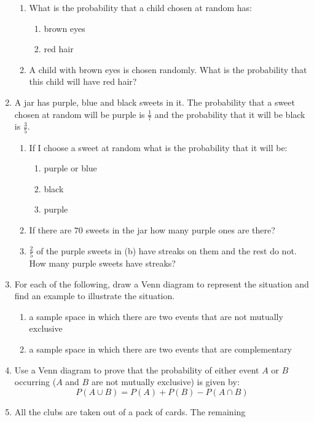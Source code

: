 \begin{eocexercises}{}
\begin{enumerate}[itemsep=5pt, label=\textbf{\arabic*}. ]
\begin{enumerate}[noitemsep, label=\textbf{(\alph*)} ]
    \item What is the probability that a child chosen at random has:
      \begin{enumerate}
      \item brown eyes
      \item red hair
      \end{enumerate} 
    \item A child with brown eyes is chosen randomly. What is the
      probability that this child will have red hair?
    \end{enumerate}
  \item A jar has purple, blue and black sweets in it. The probability
    that a sweet chosen at random will be purple is $\frac{1}{7}$
    and the probability that it will be black is $\frac{3}{5}$.
    \begin{enumerate}[noitemsep, label=\textbf{(\alph*)} ]
\item If I choose a sweet at random what
      is the probability that it will be:
      \begin{enumerate}
      \item purple or blue
      \item black
      \item purple
      \end{enumerate}
    \item If there are $70$ sweets in the jar how many purple ones are
      there?
    \item $\frac{2}{5}$ of the purple sweets in (b) have streaks on
      them and the rest do not. How many purple sweets have streaks?
    \end{enumerate}
\item For each of the following, draw a Venn diagram to represent
    the situation and find an example to illustrate the situation.
    \begin{enumerate}[noitemsep, label=\textbf{(\alph*)} ]
    \item a sample space in which there are two events that are not
      mutually exclusive
    \item a sample space in which there are two events that are
      complementary
    \end{enumerate}
\item Use a Venn diagram to prove that the probability of either
    event $A$ or $B$ occurring ($A$ and $B$ are not
    mutually exclusive) is given by: 
    \[P(A \cup B) = P(A) + P(B) - P(A \cap B)\]
\item All the clubs are taken out of a pack of cards. The remaining

\end{enumerate}
\end{eocexercises}
